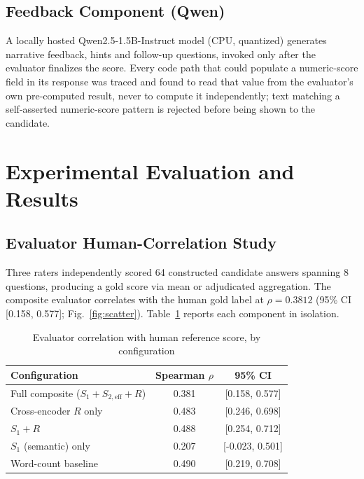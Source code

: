 \documentclass[conference]{IEEEtran}
\begin{document}
\subsection{Feedback Component (Qwen)}
\label{sec:qwen}

A locally hosted Qwen2.5-1.5B-Instruct model (CPU, quantized) generates narrative feedback, hints and follow-up questions, invoked only after the evaluator finalizes the score. Every code path that could populate a numeric-score field in its response was traced and found to read that value from the evaluator's own pre-computed result, never to compute it independently; text matching a self-asserted numeric-score pattern is rejected before being shown to the candidate.

\section{Experimental Evaluation and Results}
\label{sec:results}

\subsection{Evaluator Human-Correlation Study}
\label{sec:evalresults}

Three raters independently scored 64 constructed candidate answers spanning 8 questions, producing a gold score via mean or adjudicated aggregation. The composite evaluator correlates with the human gold label at $\rho = 0.3812$ (95\% CI [0.158, 0.577]; Fig.~\ref{fig:scatter}). Table~\ref{tab:eval} reports each component in isolation.

\begin{table}[t]
\caption{Evaluator correlation with human reference score, by configuration}
\label{tab:eval}
\centering
\begin{tabular}{lcc}
\toprule
Configuration & Spearman $\rho$ & 95\% CI \\
\midrule
Full composite ($S_1{+}S_{2,\mathrm{eff}}{+}R$) & 0.381 & [0.158, 0.577] \\
Cross-encoder $R$ only & 0.483 & [0.246, 0.698] \\
$S_1 + R$ & 0.488 & [0.254, 0.712] \\
$S_1$ (semantic) only & 0.207 & [-0.023, 0.501] \\
Word-count baseline & 0.490 & [0.219, 0.708] \\
\bottomrule
\end{tabular}
\end{table}
\end{document}
